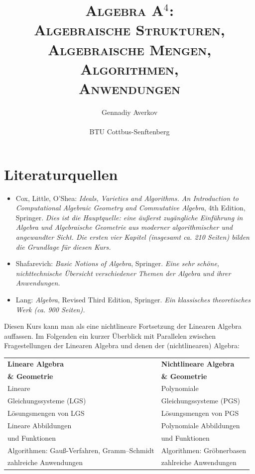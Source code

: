 \documentclass[11pt]{article}
\title{\textsc{Algebra A${}^4$: 
		\\ Algebraische Strukturen, 
		\\ Algebraische Mengen, 
		\\ Algorithmen, 
		\\ Anwendungen}}
\author{Gennadiy Averkov
\\
\\ BTU Cottbus-Senftenberg}
\numberwithin{equation}{section}
\begin{document}
\maketitle


\clearpage 

\tableofcontents

\clearpage

\section*{Literaturquellen}

\begin{itemize}
	\item Cox, Little, O'Shea: \emph{Ideals, Varieties and Algorithms. An Introduction to Computational Algebraic Geometry and Commutative Algebra}, 4th Edition, Springer. \emph{Dies ist die Hauptquelle: eine äußerst zugängliche Einführung in Algebra und Algebraische Geometrie aus moderner algorithmischer und angewandter Sicht. Die ersten vier Kapitel (insgesamt ca. 210 Seiten) bilden die Grundlage für diesen Kurs.}
	\item Shafarevich: \emph{Basic Notions of Algebra}, Springer. \emph{Eine sehr schöne, nichttechnische Übersicht verschiedener Themen der Algebra und ihrer Anwendungen.}
	\item Lang: \emph{Algebra}, Revised Third Edition, Springer.  \emph{Ein klassisches theoretisches Werk (ca. 900 Seiten).} 
\end{itemize} 

\clearpage 

Diesen Kurs kann man als eine nichtlineare Fortsetzung der Linearen Algebra auffassen. Im Folgenden ein kurzer Überblick mit Parallelen zwischen Fragestellungen der Linearen Algebra und denen der (nichtlinearen) Algebra:

\begin{center} 
	\begin{tabular}{l|l}
		\textbf{Lineare Algebra} & \textbf{Nichtlineare Algebra}
		\\ \textbf{\& Geometrie} & \textbf{\& Geometrie} 
		\\ \hline\hline 
		Lineare  & Polynomiale 
		\\ Gleichungssysteme (LGS) & Gleichungssysteme (PGS) 
		\\ \hline 
		Lösungsmengen von LGS & Lösungsmengen von PGS
		\\ \hline 
		Lineare Abbildungen  & Polynomiale Abbildungen
		\\ und Funktionen &  und Funktionen 
		\\ \hline 
		Algorithmen: Gauß-Verfahren, Gramm–Schmidt & Algorithmen: Gröbnerbasen 
		\\ \hline 
		zahlreiche Anwendungen & zahlreiche Anwendungen 
	\end{tabular}  
\end{center} 
\end{document}
